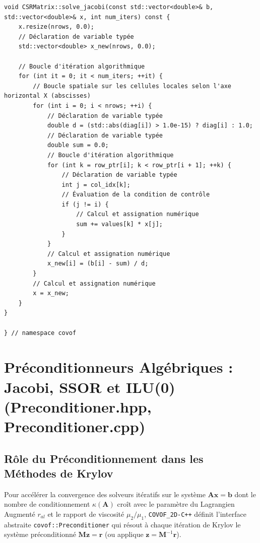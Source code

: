 \documentclass[10pt,a4paper,oneside]{book}
\begin{document}
\begin{lstlisting}[language={[11]C++}]
void CSRMatrix::solve_jacobi(const std::vector<double>& b, std::vector<double>& x, int num_iters) const {
    x.resize(nrows, 0.0);
    // Déclaration de variable typée
    std::vector<double> x_new(nrows, 0.0);

    // Boucle d'itération algorithmique
    for (int it = 0; it < num_iters; ++it) {
        // Boucle spatiale sur les cellules locales selon l'axe horizontal X (abscisses)
        for (int i = 0; i < nrows; ++i) {
            // Déclaration de variable typée
            double d = (std::abs(diag[i]) > 1.0e-15) ? diag[i] : 1.0;
            // Déclaration de variable typée
            double sum = 0.0;
            // Boucle d'itération algorithmique
            for (int k = row_ptr[i]; k < row_ptr[i + 1]; ++k) {
                // Déclaration de variable typée
                int j = col_idx[k];
                // Évaluation de la condition de contrôle
                if (j != i) {
                    // Calcul et assignation numérique
                    sum += values[k] * x[j];
                }
            }
            // Calcul et assignation numérique
            x_new[i] = (b[i] - sum) / d;
        }
        // Calcul et assignation numérique
        x = x_new;
    }
}

} // namespace covof

\end{lstlisting}

\chapter{Préconditionneurs Algébriques : Jacobi, SSOR et ILU(0) (Preconditioner.hpp, Preconditioner.cpp)}
\section{Rôle du Préconditionnement dans les Méthodes de Krylov}
Pour accélérer la convergence des solveurs itératifs sur le système $\mathbf{A}\mathbf{x} = \mathbf{b}$ dont le nombre de conditionnement $\kappa(\mathbf{A})$ croît avec le paramètre du Lagrangien Augmenté $r_{al}$ et le rapport de viscosité $\mu_2 / \mu_1$, \texttt{COVOF\_2D-C++} définit l'interface abstraite \texttt{covof::Preconditioner} qui résout à chaque itération de Krylov le système préconditionné $\mathbf{M}\mathbf{z} = \mathbf{r}$ (ou applique $\mathbf{z} = \mathbf{M}^{-1}\mathbf{r}$).
\end{document}

